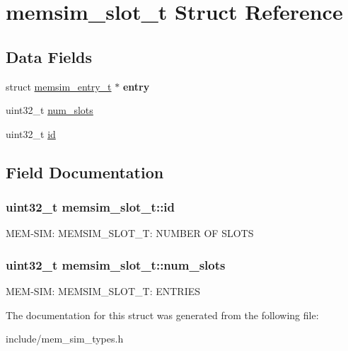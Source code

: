 \hypertarget{structmemsim__slot__t}{\section{memsim\-\_\-slot\-\_\-t Struct Reference}
\label{structmemsim__slot__t}
}
\subsection*{Data Fields}
\begin{DoxyCompactItemize}
\item 
\hypertarget{structmemsim__slot__t_ad0d9c1c64c0a110c1bc81ce1c919bad0}{struct \hyperlink{structmemsim__entry__t}{memsim\-\_\-entry\-\_\-t} $\ast$ {\bfseries entry}}\label{structmemsim__slot__t_ad0d9c1c64c0a110c1bc81ce1c919bad0}

\item 
uint32\-\_\-t \hyperlink{structmemsim__slot__t_a18f23ad9c0a96fbe2802c3aac6e9054d}{num\-\_\-slots}
\item 
uint32\-\_\-t \hyperlink{structmemsim__slot__t_a960e4f67aacef2a35af9b5cbe1ac145b}{id}
\end{DoxyCompactItemize}


\subsection{Field Documentation}
\hypertarget{structmemsim__slot__t_a960e4f67aacef2a35af9b5cbe1ac145b}{
\subsubsection[{id}]{\setlength{\rightskip}{0pt plus 5cm}uint32\-\_\-t memsim\-\_\-slot\-\_\-t\-::id}}\label{structmemsim__slot__t_a960e4f67aacef2a35af9b5cbe1ac145b}
M\-E\-M-\/\-S\-I\-M\-: M\-E\-M\-S\-I\-M\-\_\-\-S\-L\-O\-T\-\_\-\-T\-: N\-U\-M\-B\-E\-R O\-F S\-L\-O\-T\-S \hypertarget{structmemsim__slot__t_a18f23ad9c0a96fbe2802c3aac6e9054d}{
\subsubsection[{num\-\_\-slots}]{\setlength{\rightskip}{0pt plus 5cm}uint32\-\_\-t memsim\-\_\-slot\-\_\-t\-::num\-\_\-slots}}\label{structmemsim__slot__t_a18f23ad9c0a96fbe2802c3aac6e9054d}
M\-E\-M-\/\-S\-I\-M\-: M\-E\-M\-S\-I\-M\-\_\-\-S\-L\-O\-T\-\_\-\-T\-: E\-N\-T\-R\-I\-E\-S 

The documentation for this struct was generated from the following file\-:\begin{DoxyCompactItemize}
\item 
include/mem\-\_\-sim\-\_\-types.\-h\end{DoxyCompactItemize}
